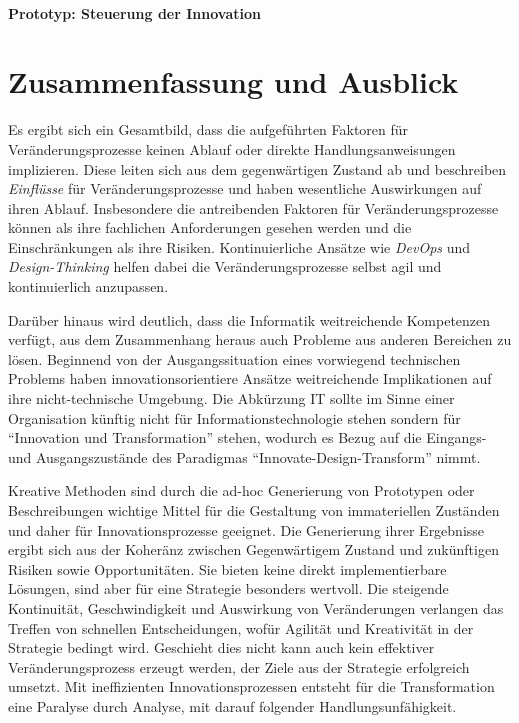 \paragraph{Prototyp: Steuerung der Innovation}


\section{Zusammenfassung und Ausblick}
Es ergibt sich ein Gesamtbild, dass die aufgeführten Faktoren für Veränderungsprozesse keinen Ablauf oder direkte Handlungsanweisungen implizieren. Diese leiten sich aus dem gegenwärtigen Zustand ab und beschreiben \emph{Einflüsse} für Veränderungsprozesse und haben wesentliche Auswirkungen auf ihren Ablauf. Insbesondere die antreibenden Faktoren für Veränderungsprozesse können als ihre fachlichen Anforderungen gesehen werden und die Einschränkungen als ihre Risiken. Kontinuierliche Ansätze wie \emph{DevOps} und \emph{Design-Thinking} helfen dabei die Veränderungsprozesse selbst agil und kontinuierlich anzupassen. 

Darüber hinaus wird deutlich, dass die Informatik weitreichende Kompetenzen verfügt, aus dem Zusammenhang heraus auch Probleme aus anderen Bereichen zu lösen. Beginnend von der Ausgangssituation eines vorwiegend technischen Problems haben innovationsorientiere Ansätze weitreichende Implikationen auf ihre nicht-technische Umgebung. Die Abkürzung IT sollte im Sinne einer Organisation künftig nicht für Informationstechnologie stehen sondern für \enquote{Innovation und Transformation} stehen, wodurch es Bezug auf die Eingangs- und Ausgangszustände des Paradigmas \enquote{Innovate-Design-Transform} nimmt.

Kreative Methoden sind durch die ad-hoc Generierung von Prototypen oder Beschreibungen wichtige Mittel für die Gestaltung von immateriellen Zuständen und daher für Innovationsprozesse geeignet. Die Generierung ihrer Ergebnisse ergibt sich aus der Koheränz zwischen Gegenwärtigem Zustand und zukünftigen Risiken sowie Opportunitäten. Sie bieten keine direkt implementierbare Lösungen, sind aber für eine Strategie besonders wertvoll. Die steigende Kontinuität, Geschwindigkeit und Auswirkung von Veränderungen verlangen das Treffen von schnellen Entscheidungen, wofür Agilität und Kreativität in der Strategie bedingt wird. Geschieht dies nicht kann auch kein effektiver Veränderungsprozess erzeugt werden, der Ziele aus der Strategie erfolgreich umsetzt. Mit ineffizienten Innovationsprozessen entsteht für die Transformation eine Paralyse durch Analyse, mit darauf folgender Handlungsunfähigkeit. 

